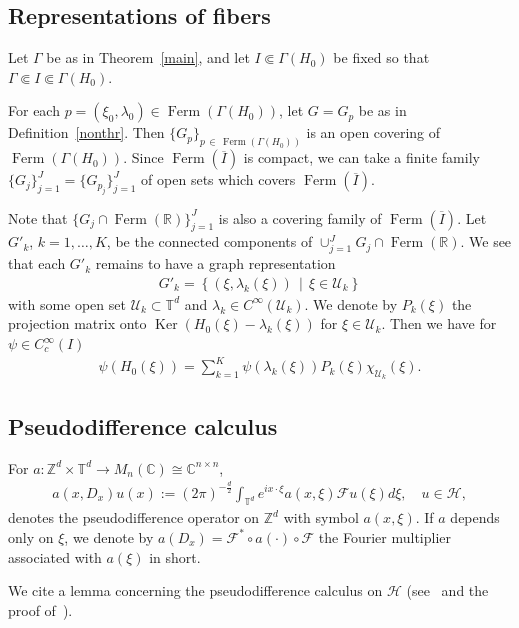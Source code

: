 \documentclass[10pt]{amsart}
\theoremstyle{definition}
\numberwithin{equation}{section}
\newcommand{\ps}{\psi}
\renewcommand{\l}{\lambda}
\newcommand{\x}{\xi}
\newcommand{\C}{\mathbb{C}}
\newcommand{\R}{\mathbb{R}}
\newcommand{\Z}{\mathbb{Z}}
\newcommand{\T}{\mathbb{T}}
\newcommand{\HS}{\mathcal{H}}
\newcommand{\US}{\mathcal{U}}
\newcommand{\FS}{\mathcal{F}}
\DeclareMathOperator{\kerr}{Ker}
\DeclareMathOperator{\Ferm}{Ferm}
\begin{document}
\subsection{Representations of fibers}

Let $\Gamma$ be as in Theorem~\ref{main}, and let $I \Subset \Gamma(H_0)$ be fixed so that $\Gamma \Subset I \Subset \Gamma(H_0)$.

For each $p=(\x_0,\l_0) \in \Ferm(\Gamma(H_0))$, let $G=G_p$ be as in Definition~\ref{nonthr}. Then $\{ G_p \}_{p\,\in\,\Ferm(\Gamma(H_0))}$ is an open covering of $\Ferm(\Gamma(H_0))$. Since $\Ferm(\overline{I})$ is compact, we can take a finite family $\{ G_{j} \}_{j=1}^J = \{ G_{p_j} \}_{j=1}^J$ of open sets which covers $\Ferm(\overline{I})$.

Note that $\{ G_j \cap \Ferm(\R) \}_{j=1}^J$ is also a covering family of $\Ferm(\overline{I})$. Let $G'_k$, $k=1,\dots,K$, be the connected components of $\cup_{j=1}^J G_j \cap \Ferm(\R)$. We see that each $G'_k$ remains to have a graph representation
\begin{align}\label{G_k representation}
G'_k=\left\{ (\x,\l_k(\x)) \,\middle|\, \x \in \US_k \right\}
\end{align}
with some open set $\US_k \subset \T^d$ and $\l_k\in C^\infty(\US_k)$. We denote by $P_k(\x)$ the projection matrix onto $\kerr (H_0(\x)-\l_k(\x))$ for $\x\in \US_k$. Then we have for $\psi\in C_c^\infty(I)$
\begin{align}\label{Rep of E_H0}
\ps(H_0(\x)) = \sum_{k=1}^K \ps(\l_k(\x)) P_k(\x) \chi_{\US_k}(\x).
\end{align}


\subsection{Pseudodifference calculus}

For $a:\Z^d \times \T^d \to M_n(\C)\cong \C^{n\times n}$,
\begin{align*}
a(x,D_x)u(x) :=(2\pi)^{-\frac{d}{2}}\int_{\T^d} e^{ix\cdot\x} a(x,\x) \FS u(\x)d\x, \quad u\in \HS,
\end{align*}
denotes the pseudodifference operator on $\Z^d$ with symbol $a(x,\x)$. If $a$ depends only on $\x$, we denote by $a(D_x)=\FS^*\circ a(\cdot) \circ \FS$ the Fourier multiplier associated with $a(\x)$ in short.

We cite a lemma concerning the pseudodifference calculus on $\HS$ (see~\cite[Theorem~4.2.10]{R-T} and the proof of~\cite[Lemma~2.2]{T1}).
\end{document}
